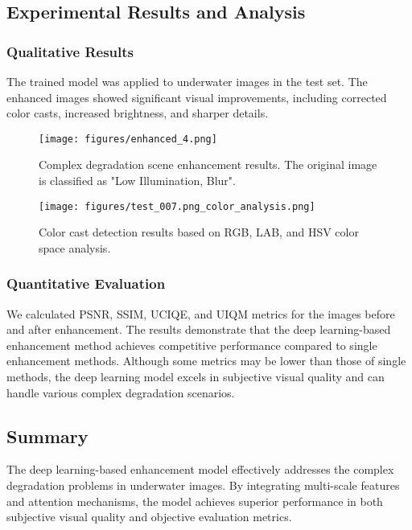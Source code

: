 \documentclass{apmcmthesis}
\begin{document}
\subsection{Experimental Results and Analysis}

\subsubsection{Qualitative Results}
The trained model was applied to underwater images in the test set. The enhanced images showed significant visual improvements, including corrected color casts, increased brightness, and sharper details.

\begin{figure}[!ht]
    \centering
    \texttt{[image: figures/enhanced\_4.png]}
    \caption{ Complex degradation scene enhancement results. The original image is classified as "Low Illumination, Blur".}
    \label{fig:example_6}
\end{figure}

\begin{figure}[!ht]
    \centering
    \texttt{[image: figures/test\_007.png\_color\_analysis.png]}
    \caption{ Color cast detection results based on RGB, LAB, and HSV color space analysis.}
    \label{fig:example_7}
\end{figure}

\subsubsection{Quantitative Evaluation}
We calculated PSNR, SSIM, UCIQE, and UIQM metrics for the images before and after enhancement. The results demonstrate that the deep learning-based enhancement method achieves competitive performance compared to single enhancement methods. Although some metrics may be lower than those of single methods, the deep learning model excels in subjective visual quality and can handle various complex degradation scenarios.

\subsection{Summary}
The deep learning-based enhancement model effectively addresses the complex degradation problems in underwater images. By integrating multi-scale features and attention mechanisms, the model achieves superior performance in both subjective visual quality and objective evaluation metrics.
\end{document}
